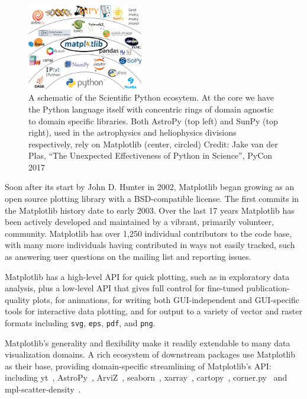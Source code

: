 \documentclass[12pt]{article}
\numberwithin{page}{section}
\begin{document}
\begin{figure}
  \includegraphics[width=0.45\textwidth]{scipy-ecosystem}
  \caption{A schematic of the Scientific Python ecosytem.  At the
    core we have the Python language itself with concentric rings of
    domain agnostic to domain specific libraries.  Both AstroPy (top
    left) and SunPy (top right), used in the astrophysics and
    heliophysics divisions respectively, rely on Matplotlib (center, circled)
    Credit: Jake van der Plas, ``The Unexpected Effectiveness of Python
    in Science'', PyCon 2017}
  \label{fig:ecosystem}
\end{figure}


Soon after its start by John D. Hunter in 2002, Matplotlib began growing as an
open source plotting
library with a BSD-compatible license. The
first commits in the Matplotlib history date to early 2003.  Over the
last 17 years Matplotlib has been actively developed and maintained by
a vibrant, primarily volunteer, community.  Matplotlib has over 1,250
individual contributors to the code base, with many more individuals
having contributed in ways not easily tracked, such as answering user
questions on the mailing list and reporting issues.

Matplotlib has a high-level API for quick plotting, such as in
exploratory data analysis, plus a low-level API that gives full control for
fine-tuned publication-quality plots, for animations, for writing both
GUI-independent and GUI-specific tools for interactive data plotting, and
for output to a variety of vector and raster
formats including \texttt{svg}, \texttt{eps},
\texttt{pdf}, and \texttt{png}.

Matplotlib's generality and flexibility make it readily extendable to
many data visualization domains.  A rich ecosystem of downstream packages use
Matplotlib as their base, providing domain-specific streamlining of
Matplotlib's API: including
yt~\cite{2011ApJS..192....9T}, AstroPy~\cite{astropy:2013,
  astropy:2018}, ArviZ~\cite{arviz_2019},
seaborn~\cite{waskom2020seaborn}, xarray~\cite{hoyer2017xarray},
cartopy~\cite{Cartopy}, corner.py~\cite{corner} and
mpl-scatter-density~\cite{mpl-scatter-density}.
\end{document}
